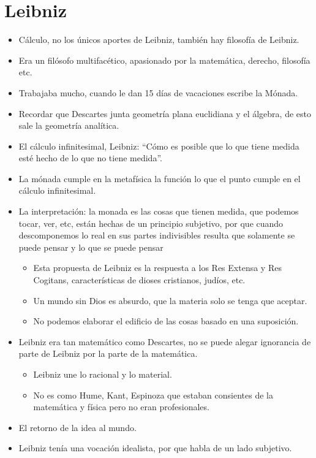 \section{Leibniz}
\begin{itemize}
    \item Cálculo, no los únicos aportes de Leibniz, también hay filosofía de Leibniz. 
    \item Era un filósofo multifacético, apasionado por la matemática, derecho, filosofía etc. 
    \item Trabajaba mucho, cuando le dan 15 días de vacaciones escribe la Mónada.
    \item Recordar que Descartes junta geometría plana euclidiana y el álgebra, de esto sale la geometría analítica. 
    \item El cálculo infinitesimal, Leibniz: ``Cómo es posible que lo que tiene medida esté hecho de lo que no tiene medida''.
    \item La mónada cumple en la metafísica la función lo que el punto cumple en el cálculo infinitesimal.
    \item La interpretación: la monada es las cosas que tienen medida, que podemos tocar, ver, etc, están hechas de un principio subjetivo, por que cuando descomponemos lo real en sus partes indivisibles resulta que solamente se puede pensar y lo que se puede pensar 
        \begin{itemize}
            \item Esta propuesta de Leibniz es la respuesta a los Res Extensa y Res Cogitans, características de dioses cristianos, judíos, etc. 
            \item Un mundo sin Dios es absurdo, que la materia solo se tenga que aceptar. 
            \item No podemos elaborar el edificio de las cosas basado en una suposición. 
        \end{itemize}
    
    \item Leibniz era tan matemático como Descartes, no se puede alegar ignorancia de parte de Leibniz por la parte de la matemática. 
        \begin{itemize}
            \item Leibniz une lo racional y lo material. 
            \item No es como Hume, Kant, Espinoza que estaban consientes de la matemática y física pero no eran profesionales.
        \end{itemize}
    
    \item El retorno de la idea al mundo. 
    \item Leibniz tenía una vocación idealista, por que habla de un lado subjetivo.
\end{itemize}

